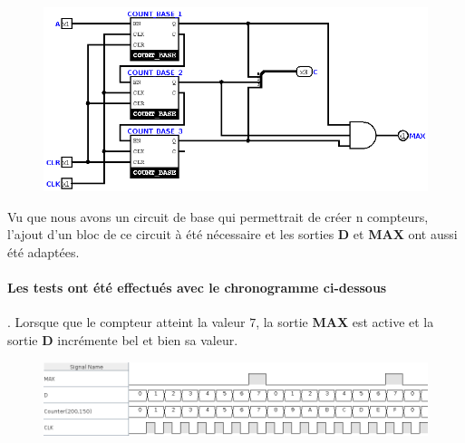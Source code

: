 \documentclass[a4paper]{article} %
\begin{document}
\begin{tcolorbox}[colframe=Monokaimagenta,colback=white]

\begin{figure}[H]
\centering
    \includegraphics[width=1\textwidth]{src/COUNT_8BITS.png}
    \label{fig:count4bits}
\end{figure}

Vu que nous avons un circuit de base qui permettrait de créer n compteurs, l'ajout d'un bloc de ce circuit à été nécessaire et les sorties \textbf{D} et \textbf{MAX} ont aussi été adaptées.

\paragraph{Les tests ont été effectués avec le chronogramme ci-dessous}. Lorsque que le compteur atteint la valeur $7$, la sortie \textbf{MAX} est active et la sortie \textbf{D} incrémente bel et bien sa valeur.
\begin{figure}[H]
\centering
    \includegraphics[width=1\textwidth]{src/chrono_COUNT_8.png}
    \label{fig:count8bits}
\end{figure}

\end{tcolorbox}
\end{document}
